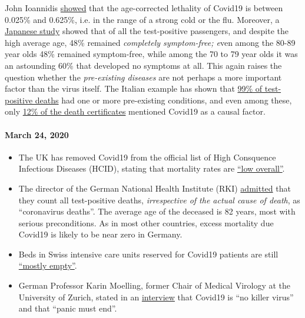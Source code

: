 \begin{itemize}
  John Ioannidis
  \href{https://www.statnews.com/2020/03/17/a-fiasco-in-the-making-as-the-coronavirus-pandemic-takes-hold-we-are-making-decisions-without-reliable-data/}{showed}
  that the age-corrected lethality of Covid19 is between 0.025\% and
  0.625\%, i.e. in the range of a strong cold or the flu. Moreover, a
  \href{https://www.niid.go.jp/niid/en/2019-ncov-e/9407-covid-dp-fe-01.html}{Japanese
  study} showed that of all the test-positive passengers, and despite
  the high average age, 48\% remained \emph{completely symptom-free;
  e}ven among the 80-89 year olds 48\% remained symptom-free, while
  among the 70 to 79 year olds it was an astounding 60\% that developed
  no symptoms at all. This again raises the question whether the
  \emph{pre-existing diseases} are not perhaps a more important factor
  than the virus itself. The Italian example has shown that
  \href{https://www.bloomberg.com/news/articles/2020-03-18/99-of-those-who-died-from-virus-had-other-illness-italy-says}{99\%
  of test-positive deaths} had one or more pre-existing conditions, and
  even among these, only
  \href{https://web.archive.org/web/20200324214448/https://www.telegraph.co.uk/global-health/science-and-disease/have-many-coronavirus-patients-died-italy/}{12\%
  of the death certificates} mentioned Covid19 as a causal factor.
\end{itemize}

\hypertarget{march-24-2020}{%
\paragraph{March 24, 2020}\label{march-24-2020}}

\begin{itemize}
\tightlist
\item
  The UK has removed Covid19 from the official list of High Consquence
  Infectious Diseases (HCID), stating that mortality rates are
  \href{https://www.gov.uk/guidance/high-consequence-infectious-diseases-hcid\#status-of-covid-19}{``low
  overall''}.
\item
  The director of the German National Health Institute (RKI)
  \href{https://swprs.org/rki-relativiert-corona-todesfaelle/}{admitted}
  that they count all test-positive deaths, \emph{irrespective of the
  actual cause of death}, as ``coronavirus deaths''. The average age of
  the deceased is 82 years, most with serious preconditions. As in most
  other countries, excess mortality due Covid19 is likely to be near
  zero in Germany.
\item
  Beds in Swiss intensive care units reserved for Covid19 patients are
  still
  \href{https://www.aargauerzeitung.ch/aargau/kanton-aargau/erst-3-von-100-aargauer-betten-der-intensivstationen-sind-belegt-so-ruesten-sich-die-spitaeler-auf-die-epidemie-137332716}{``mostly
  empty''}.
\item
  German Professor Karin Moelling, former Chair of Medical Virology at
  the University of Zurich, stated in an
  \href{https://www.radioeins.de/programm/sendungen/die_profis/archivierte_sendungen/beitraege/corona-virus-kein-killervirus.html}{interview}
  that Covid19 is ``no killer virus'' and that ``panic must end''.
\end{itemize}

